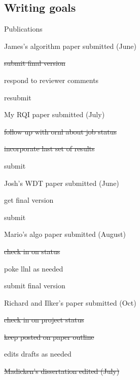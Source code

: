 \documentclass[12pt,twoside]{article}
\begin{document}
\subsection{Writing goals}
\begin{compactitem}
\item Publications
  \begin{compactitem}
  \item James's algorithm paper submitted (June)
     \begin{compactitem}
     \item \st{submit final version}
     \item respond to reviewer comments
     \item resubmit
     \end{compactitem}
  \item My RQI paper submitted (July)
     \begin{compactitem}
     \item \st{follow up with ornl about job status}
     \item \st{incorporate last set of results}
     \item submit
     \end{compactitem}
  \item Josh's WDT paper submitted (June)
     \begin{compactitem}
     \item get final version
     \item submit
     \end{compactitem}
  \item Mario's algo paper submitted (August)
     \begin{compactitem}
     \item \st{check in on status}
     \item poke llnl as needed
     \item submit final version
     \end{compactitem}
  \item Richard and Ilker's paper submitted (Oct)
     \begin{compactitem}
     \item \st{check in on project status}
     \item \st{keep posted on paper outline}
     \item edits drafts as needed
     \end{compactitem}
  \item \st{Madicken's dissertation edited (July)}
     \begin{compactitem}

\end{compactitem}
\end{compactitem}
\end{compactitem}
\end{document}
